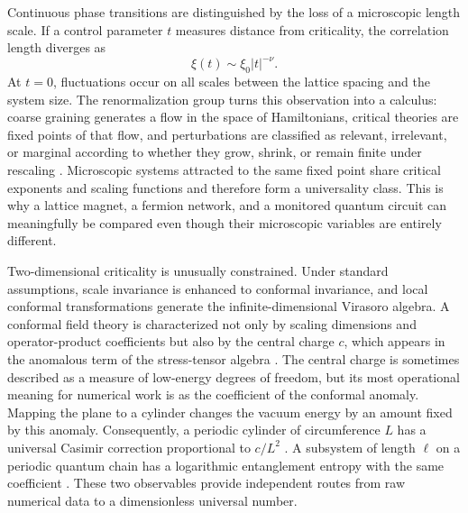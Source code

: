 \documentclass[aps,prb,reprint,superscriptaddress,longbibliography,floatfix]{revtex4-2}
\begin{document}
Continuous phase transitions are distinguished by the loss of a microscopic
length scale.  If a control parameter $t$ measures distance from criticality,
the correlation length diverges as
\begin{equation}
 \xi(t)\sim \xi_0 |t|^{-\nu}.
 \label{eq:correlation-length}
\end{equation}
At $t=0$, fluctuations occur on all scales between the lattice spacing and
the system size.  The renormalization group turns this observation into a
calculus: coarse graining generates a flow in the space of Hamiltonians,
critical theories are fixed points of that flow, and perturbations are
classified as relevant, irrelevant, or marginal according to whether they
grow, shrink, or remain finite under rescaling
\cite{WilsonKogut1974}.  Microscopic systems attracted to the same fixed point
share critical exponents and scaling functions and therefore form a
universality class.  This is why a lattice magnet, a fermion network, and a
monitored quantum circuit can meaningfully be compared even though their
microscopic variables are entirely different.

Two-dimensional criticality is unusually constrained.  Under standard
assumptions, scale invariance is enhanced to conformal invariance, and local
conformal transformations generate the infinite-dimensional Virasoro
algebra.  A conformal field theory is characterized not only by scaling
dimensions and operator-product coefficients but also by the central charge
$c$, which appears in the anomalous term of the stress-tensor algebra
\cite{BelavinPolyakovZamolodchikov1984,
DiFrancescoMathieuSenechal1997}.  The central charge is sometimes described as
a measure of low-energy degrees of freedom, but its most operational meaning
for numerical work is as the coefficient of the conformal anomaly.  Mapping
the plane to a cylinder changes the vacuum energy by an amount fixed by this
anomaly.  Consequently, a periodic cylinder of circumference $L$ has a
universal Casimir correction proportional to $c/L^2$
\cite{Cardy1984,BloeteCardyNightingale1986,Affleck1986}.  A subsystem of
length $\ell$ on a periodic quantum chain has a logarithmic entanglement
entropy with the same coefficient \cite{CalabreseCardy2004}.  These two
observables provide independent routes from raw numerical data to a
dimensionless universal number.
\end{document}
